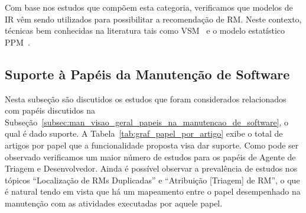 Com base nos estudos que compõem esta categoria, verificamos que modelos de IR
vêm sendo utilizados para possibilitar a recomendação de RM\@. Neste contexto,
técnicas bem conhecidas na literatura tais como VSM~\cite{Wang2011bug} e o
modelo estatístico PPM~\cite{malheiros2012source}.

\subsection{Suporte à Papéis da Manutenção de Software}
\label{sub:extensões_com_suporte_a_papeis}

Nesta subseção são discutidos os estudos que foram considerados relacionados com
papéis discutidos na
Subseção~\ref{subsec:man_visao_geral_papeis_na_manutencao_de_software}, o qual é
dado suporte. A Tabela~\ref{tab:graf_papel_por_artigo} exibe o total de artigos
por papel que a funcionalidade proposta visa dar suporte.  Como pode ser
observado verificamos um maior número de estudos para os papéis de Agente de
Triagem e Desenvolvedor. Ainda é possível observar a prevalência de estudos nos
tópicos ``Localização de RMs Duplicadas'' e ``Atribuição [Triagem] de RM'', o
que é natural tendo em vista que há um mapeamento entre o papel desempenhado na
manutenção com as atividades executadas por aquele papel.

\begin{table}[htpb]
\centering
{}
\caption{Total de artigos por papel na manutenção de software}
\label{tab:graf_papel_por_artigo}
\end{table}

